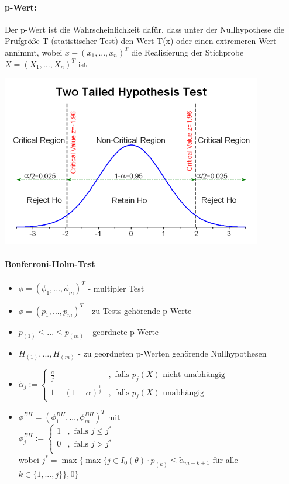 \documentclass[10pt]{report}
\theoremstyle{definition}
\begin{document}
\paragraph{p-Wert:}
Der p-Wert ist die Wahrscheinlichkeit dafür, dass unter der Nullhypothese die Prüfgröße T (statistischer Test) den Wert T(x) oder einen extremeren Wert annimmt, wobei $x-(x_1,...,x_n)^T$ die Realisierung der Stichprobe $X=(X_1,...,X_n)^T$ ist
\begin{center}
\includegraphics[scale=0.8]{twotailedtest.png}
\end{center}

\paragraph{Bonferroni-Holm-Test}
\begin{itemize}
 \item $\phi=(\phi_1,...,\phi_m)^T $ - multipler Test
 \item $\phi=(p_1,...,p_m)^T $ - zu Tests gehörende p-Werte
 \item $p_{(1)} \leq ... \leq p_{(m)} $ - geordnete p-Werte
 \item $H_{(1)},...,H_{(m)} $ - zu geordneten p-Werten gehörende Nullhypothesen
 \item $\tilde{\alpha}_j := 
	\begin{cases}
	 \frac{a}{j} & , \text{ falls } p_j(X) \text{ nicht unabhängig } \\
	 1-(1-\alpha)^{\frac{1}{j}} & , \text{ falls } p_j(X) \text{ unabhängig }
	\end{cases}
	$
 \item $\phi^{BH}=(\phi_1^{BH},...,\phi_m^{BH})^T$ mit \\
 $\phi_j^{BH} := 
      \begin{cases}
       1 & ,\text{ falls } j \leq j^* \\
       0 & ,\text{ falls } j > j^* \\
      \end{cases}
      $\\
      wobei $j^* =\max\{ \max\{j \in I_0(\theta) \cdot p_{(k)} \leq \tilde{\alpha}_{m-k+1}$ für alle $k \in \{1,...,j\}\}, 0 \}$
\end{itemize}
\end{document}
